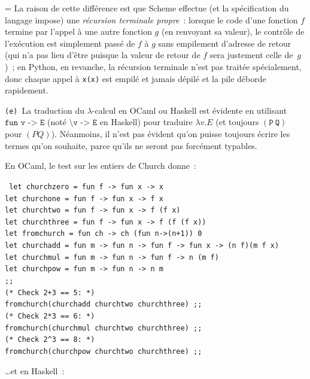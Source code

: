 \documentclass[12pt,a4paper]{article}
\theoremstyle{definition}
\newif\ifcorrige
\newenvironment{corrige}%
{\ifcorrige\relax\else\setbox0=\vbox\bgroup\fi%
\smallbreak\footnotesize\noindent{\underbar{\textit{Corrigé.}}\quad}}
{{\hbox{}\nobreak\hfill\checkmark}%
\ifcorrige\relax\else\egroup\fi\par}
\begin{document}
\begin{corrige}
La raison de cette différence est que Scheme effectue (et la
spécification du langage impose) une \emph{récursion terminale
propre} : lorsque le code d'une fonction $f$ termine par l'appel à une
autre fonction $g$ (en renvoyant sa valeur), le contrôle de
l'exécution est simplement passé de $f$ à $g$ sans empilement
d'adresse de retour (qui n'a pas lieu d'être puisque la valeur de
retour de $f$ sera justement celle de $g$) ; en Python, en revanche,
la récursion terminale n'est pas traitée spécialement, donc chaque
appel à \texttt{x(x)} est empilé et jamais dépilé et la pile déborde
rapidement.

\texttt{(e)} La traduction du $\lambda$-calcul en OCaml ou Haskell est
évidente en utilisant $\texttt{fun $\mathtt{v}$ -> $\mathtt{E}$}$
(noté $\texttt{\textbackslash $\mathtt{v}$ -> $\mathtt{E}$}$ en
Haskell) pour traduire $\lambda v.E$ (et toujours
$(\mathtt{P}\ \mathtt{Q})$ pour $(P Q)$).  Néanmoins, il n'est pas
évident qu'on puisse toujours écrire les termes qu'on souhaite, parce
qu'ils ne seront pas forcément typables.

En OCaml, le test sur les entiers de Church donne :

\noindent\texttt{%
let churchzero = fun f -> fun x -> x\\
let churchone = fun f -> fun x -> f x\\
let churchtwo = fun f -> fun x -> f (f x)\\
let churchthree = fun f -> fun x -> f (f (f x))\\
let fromchurch = fun ch -> ch (fun n->(n+1)) 0\\
let churchadd = fun m -> fun n -> fun f -> fun x -> (n f)(m f x)\\
let churchmul = fun m -> fun n -> fun f -> n (m f)\\
let churchpow = fun m -> fun n -> n m\\
;;\\
(* Check 2+3 == 5: *)\\
fromchurch(churchadd churchtwo churchthree) ;;\\
(* Check 2*3 == 6: *)\\
fromchurch(churchmul churchtwo churchthree) ;;\\
(* Check 2\textasciicircum 3 == 8: *)\\
fromchurch(churchpow churchtwo churchthree) ;;
}

\noindent …et en Haskell :


\end{corrige}
\end{document}
